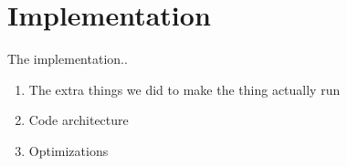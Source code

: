 \section{Implementation}
\label{sec:implementation}

The implementation..

\begin{enumerate}
    \item The extra things we did to make the thing actually run
    \item Code architecture
    \item Optimizations
\end{enumerate}

\newpage